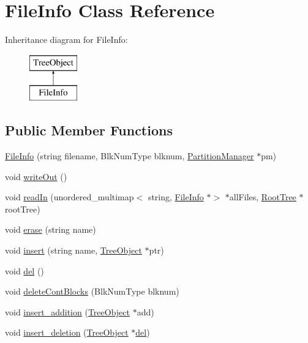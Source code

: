 \hypertarget{classFileInfo}{}\section{File\+Info Class Reference}
\label{classFileInfo}
Inheritance diagram for File\+Info\+:\begin{figure}[H]
\begin{center}
\leavevmode
\includegraphics[height=2.000000cm]{classFileInfo}
\end{center}
\end{figure}
\subsection*{Public Member Functions}
\begin{DoxyCompactItemize}
\item 
\mbox{\hyperlink{classFileInfo_a3586bb4f50c4a0f63ff4ea0a1e56ce9c}{File\+Info}} (string filename, Blk\+Num\+Type blknum, \mbox{\hyperlink{classPartitionManager}{Partition\+Manager}} $\ast$pm)
\item 
void \mbox{\hyperlink{classFileInfo_a15d8f9279f1d60e4db4618cb81e68414}{write\+Out}} ()
\item 
void \mbox{\hyperlink{classFileInfo_a0e74605dd535e73027ad1c1c6242db09}{read\+In}} (unordered\+\_\+multimap$<$ string, \mbox{\hyperlink{classFileInfo}{File\+Info}} $\ast$$>$ $\ast$all\+Files, \mbox{\hyperlink{classRootTree}{Root\+Tree}} $\ast$root\+Tree)
\item 
void \mbox{\hyperlink{classFileInfo_ae058242283d3317eaf2b79428e6137f6}{erase}} (string name)
\item 
void \mbox{\hyperlink{classFileInfo_ad93a84b63e417b07aa68b619051ab746}{insert}} (string name, \mbox{\hyperlink{classTreeObject}{Tree\+Object}} $\ast$ptr)
\item 
void \mbox{\hyperlink{classFileInfo_a2ca34d945ed1208f227a249ba72ee427}{del}} ()
\item 
void \mbox{\hyperlink{classFileInfo_a530a418e213a0a945b75ee1dcb8f6acb}{delete\+Cont\+Blocks}} (Blk\+Num\+Type blknum)
\item 
void \mbox{\hyperlink{classFileInfo_a7f788f31521c535646eebfa9959bbb24}{insert\+\_\+addition}} (\mbox{\hyperlink{classTreeObject}{Tree\+Object}} $\ast$add)
\item 
void \mbox{\hyperlink{classFileInfo_a278136b1d68f55dc56a4be807076fc0d}{insert\+\_\+deletion}} (\mbox{\hyperlink{classTreeObject}{Tree\+Object}} $\ast$\mbox{\hyperlink{classFileInfo_a2ca34d945ed1208f227a249ba72ee427}{del}})
\end{DoxyCompactItemize}
